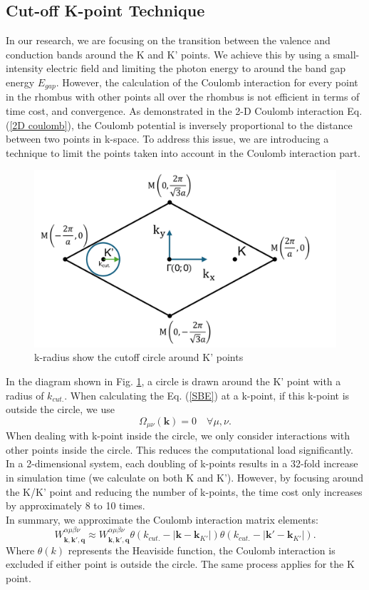 \documentclass[12pt,english,a4paper]{article}
\begin{document}
\subsection{Cut-off K-point Technique}
\quad In our research, we are focusing on the transition between the valence and conduction bands around the K and K' points. We achieve this by using a small-intensity electric field and limiting the photon energy to around the band gap energy $E_{gap}$. However, the calculation of the Coulomb interaction for every point in the rhombus with other points all over the rhombus is not efficient in terms of time cost, and convergence. As demonstrated in the 2-D Coulomb interaction Eq. (\ref{2D coulomb}), the Coulomb potential is inversely proportional to the distance between two points in k-space. To address this issue, we are introducing a technique to limit the points taken into account in the Coulomb interaction part.\\\null
\begin{figure}[ht]
	\begin{center}
		\includegraphics[width = 0.5 \linewidth]{Images/kcutoff.pdf}
		\caption{k-radius show the cutoff circle around K' points}
		\label{k cutoff}
	\end{center}
\end{figure}
\quad In the diagram shown in Fig. \ref{k cutoff}, a circle is drawn around the K' point with a radius of $k_{cut.}$. When calculating the Eq. (\ref{SBE}) at a k-point, if this k-point is outside the circle, we use
$$\Omega_{\mu \nu}(\textbf{k}) = 0 \quad \forall \mu,\nu.$$
\quad When dealing with k-point inside the circle, we only consider interactions with other points inside the circle. This reduces the computational load significantly. In a 2-dimensional system, each doubling of k-points results in a 32-fold increase in simulation time (we calculate on both K and K'). However, by focusing around the K/K' point and reducing the number of k-points, the time cost only increases by approximately 8 to 10 times.\\\null
\quad In summary, we approximate the Coulomb interaction matrix elements:
$$W^{\alpha \mu \beta \nu}_{\textbf{k},\textbf{k}',\textbf{q}} \approx W^{\alpha \mu \beta \nu}_{\textbf{k},\textbf{k}',\textbf{q}} \theta(k_{cut.} - |\textbf{k} - \textbf{k}_{K'}|) \theta(k_{cut.} - |\textbf{k}' - \textbf{k}_{K'}|).$$
\quad Where $\theta(k)$ represents the Heaviside function, the Coulomb interaction is excluded if either point is outside the circle. The same process applies for the K point.
\end{document}
